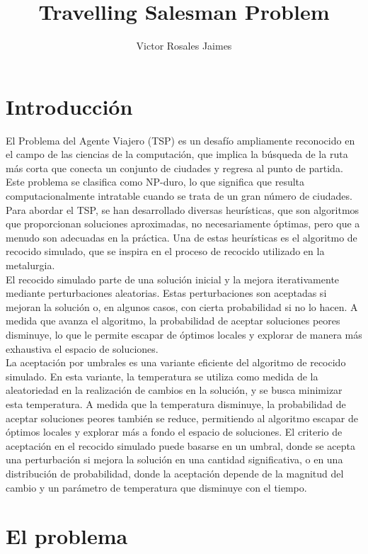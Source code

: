 \documentclass[spanish,12pt,letterpaper]{article}
\title{\textbf{Travelling Salesman Problem}}
\author{Victor Rosales Jaimes}
\date{}
\begin{document}
	\maketitle
	\section{Introducción}
	El Problema del Agente Viajero (TSP) es un desafío ampliamente reconocido en el campo de las ciencias de la computación, que implica la búsqueda de la ruta más corta que conecta un conjunto de ciudades y regresa al punto de partida. Este problema se clasifica como NP-duro, lo que significa que resulta computacionalmente intratable cuando se trata de un gran número de ciudades. Para abordar el TSP, se han desarrollado diversas heurísticas, que son algoritmos que proporcionan soluciones aproximadas, no necesariamente óptimas, pero que a menudo son adecuadas en la práctica. Una de estas heurísticas es el algoritmo de recocido simulado, que se inspira en el proceso de recocido utilizado en la metalurgia.\\
	
	
	El recocido simulado parte de una solución inicial y la mejora iterativamente mediante perturbaciones aleatorias. Estas perturbaciones son aceptadas si mejoran la solución o, en algunos casos, con cierta probabilidad si no lo hacen. A medida que avanza el algoritmo, la probabilidad de aceptar soluciones peores disminuye, lo que le permite escapar de óptimos locales y explorar de manera más exhaustiva el espacio de soluciones.\\
	
	La aceptación por umbrales es una variante eficiente del algoritmo de recocido simulado. En esta variante, la temperatura se utiliza como medida de la aleatoriedad en la realización de cambios en la solución, y se busca minimizar esta temperatura. A medida que la temperatura disminuye, la probabilidad de aceptar soluciones peores también se reduce, permitiendo al algoritmo escapar de óptimos locales y explorar más a fondo el espacio de soluciones. El criterio de aceptación en el recocido simulado puede basarse en un umbral, donde se acepta una perturbación si mejora la solución en una cantidad significativa, o en una distribución de probabilidad, donde la aceptación depende de la magnitud del cambio y un parámetro de temperatura que disminuye con el tiempo.
	\section{El problema}
	
\end{document}
